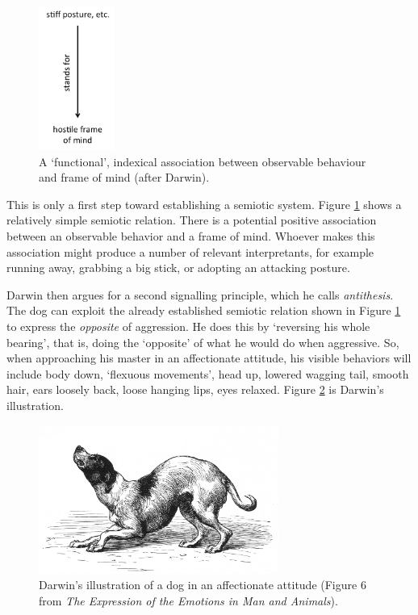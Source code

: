 \begin{figure}[h]
\includegraphics[width=0.22\textwidth,height=\textheight,keepaspectratio]{figures/Fig02}
\caption{A \textquoteleft functional', indexical association between observable 
behaviour and frame of mind (after Darwin).}
\label{functionalassoc}
\end{figure}


This is only a first step toward establishing a semiotic system. Figure 
\ref{functionalassoc} shows a relatively simple semiotic relation. There is a potential positive association between an 
observable behavior and a frame of mind. Whoever makes this association might produce a 
number of relevant interpretants, for example running away, grabbing a big 
stick, or adopting an attacking posture. 



Darwin then argues for a second signalling principle, which he calls \textit{antithesis}. The dog can exploit the already established semiotic 
relation shown in Figure \ref{functionalassoc} to express the \textit{opposite} 
of aggression. He does this by \textquoteleft reversing his whole bearing', that is, doing the 
`opposite' of what he would do when aggressive. So, when approaching 
his master in an affectionate attitude, his visible behaviors will include body 
down, \textquoteleft flexuous movements', head up, lowered wagging tail, smooth hair, 
ears loosely back, loose hanging lips, eyes relaxed. Figure \ref{darwin2} is 
Darwin's illustration.


\begin{figure}[h]
\includegraphics[width=0.70\textwidth,keepaspectratio]{figures/Fig03}
\caption{Darwin's illustration of a dog in an affectionate attitude 
(Figure 6 from \textit{The Expression of the Emotions in Man and 
Animals}).}
\label{darwin2}
\end{figure}




